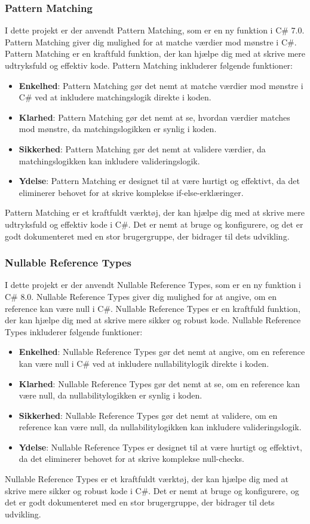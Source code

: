\subsubsection{Pattern Matching}
I dette projekt er der anvendt Pattern Matching, som er en ny funktion i C\# 7.0. Pattern Matching giver dig mulighed for at matche værdier mod mønstre i C\#. Pattern Matching er en kraftfuld funktion, der kan hjælpe dig med at skrive mere udtryksfuld og effektiv kode.
Pattern Matching inkluderer følgende funktioner:
\begin{itemize}
    \item \textbf{Enkelhed}: Pattern Matching gør det nemt at matche værdier mod mønstre i C\# ved at inkludere matchingslogik direkte i koden.
    \item \textbf{Klarhed}: Pattern Matching gør det nemt at se, hvordan værdier matches mod mønstre, da matchingslogikken er synlig i koden.
    \item \textbf{Sikkerhed}: Pattern Matching gør det nemt at validere værdier, da matchingslogikken kan inkludere valideringslogik.
    \item \textbf{Ydelse}: Pattern Matching er designet til at være hurtigt og effektivt, da det eliminerer behovet for at skrive komplekse if-else-erklæringer.
\end{itemize}
Pattern Matching er et kraftfuldt værktøj, der kan hjælpe dig med at skrive mere udtryksfuld og effektiv kode i C\#. Det er nemt at bruge og konfigurere, og det er godt dokumenteret med en stor brugergruppe, der bidrager til dets udvikling.

\subsubsection{Nullable Reference Types}
I dette projekt er der anvendt Nullable Reference Types, som er en ny funktion i C\# 8.0. Nullable Reference Types giver dig mulighed for at angive, om en reference kan være null i C\#. Nullable Reference Types er en kraftfuld funktion, der kan hjælpe dig med at skrive mere sikker og robust kode.
Nullable Reference Types inkluderer følgende funktioner:
\begin{itemize}
    \item \textbf{Enkelhed}: Nullable Reference Types gør det nemt at angive, om en reference kan være null i C\# ved at inkludere nullabilitylogik direkte i koden.
    \item \textbf{Klarhed}: Nullable Reference Types gør det nemt at se, om en reference kan være null, da nullabilitylogikken er synlig i koden.
    \item \textbf{Sikkerhed}: Nullable Reference Types gør det nemt at validere, om en reference kan være null, da nullabilitylogikken kan inkludere valideringslogik.
    \item \textbf{Ydelse}: Nullable Reference Types er designet til at være hurtigt og effektivt, da det eliminerer behovet for at skrive komplekse null-checks.
\end{itemize}
Nullable Reference Types er et kraftfuldt værktøj, der kan hjælpe dig med at skrive mere sikker og robust kode i C\#. Det er nemt at bruge og konfigurere, og det er godt dokumenteret med en stor brugergruppe, der bidrager til dets udvikling.

